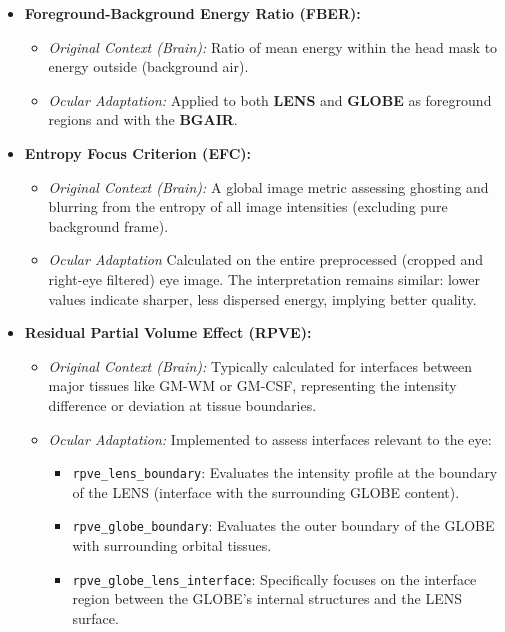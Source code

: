 \begin{itemize}
    \item \textbf{Foreground-Background Energy Ratio (FBER):}
        \begin{itemize}
            \item \textit{Original Context (Brain):} Ratio of mean energy within the head mask to energy outside (background air).
            \item \textit{Ocular Adaptation:} Applied to both \textbf{LENS} and \textbf{GLOBE} as foreground regions and with the \textbf{BGAIR}. 
        \end{itemize}
        
    \item \textbf{Entropy Focus Criterion (EFC):}
        \begin{itemize}
            \item \textit{Original Context (Brain):} A global image metric assessing ghosting and blurring from the entropy of all image intensities (excluding pure background frame).
            \item \textit{Ocular Adaptation} Calculated on the entire preprocessed (cropped and right-eye filtered) eye image. The interpretation remains similar: lower values indicate sharper, less dispersed energy, implying better quality.
        \end{itemize}
        
    \item \textbf{Residual Partial Volume Effect (RPVE):}
        \begin{itemize}
            \item \textit{Original Context (Brain):} Typically calculated for interfaces between major tissues like GM-WM or GM-CSF, representing the intensity difference or deviation at tissue boundaries.
            \item \textit{Ocular Adaptation:} Implemented to assess interfaces relevant to the eye:
                \begin{itemize}
                    \item \texttt{rpve\_lens\_boundary}: Evaluates the intensity profile at the boundary of the LENS (interface with the surrounding GLOBE content).
                    \item \texttt{rpve\_globe\_boundary}: Evaluates the outer boundary of the GLOBE with surrounding orbital tissues.
                    \item \texttt{rpve\_globe\_lens\_interface}: Specifically focuses on the interface region between the GLOBE's internal structures and the LENS surface.
                \end{itemize}
        \end{itemize}
\end{itemize}

